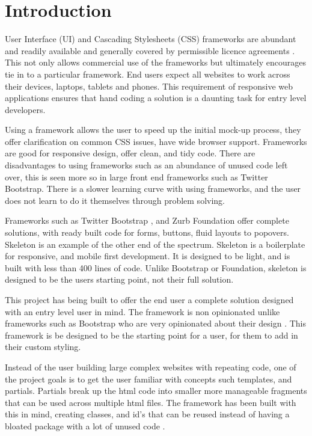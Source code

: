 \newpage
\chapter*{Introduction}

%
%

User Interface (UI) and Cascading Stylesheets (CSS) frameworks are abundant and readily available and generally covered by permissible licence agreements \citep{CODY16}. This not only allows commercial use of the frameworks but ultimately encourages tie in to a particular framework. End users expect all websites to work across their devices, laptops, tablets and phones. This requirement of responsive web applications ensures that hand coding a solution is a daunting task for entry level developers.

Using a framework allows the user to speed up the initial mock-up process, they offer clarification on common CSS issues, have wide browser support. Frameworks are good for responsive design, offer clean, and tidy code. There are disadvantages to using frameworks such as an abundance of unused code left over, this is seen more so in large front end frameworks such as Twitter Bootstrap. There is a slower learning curve with using frameworks, and the user does not learn to do it themselves through problem solving. 

Frameworks such as Twitter Bootstrap \citep{SASS16}, and Zurb Foundation \citep{LESS16} offer complete solutions, with ready built code for forms, buttons, fluid layouts to popovers. Skeleton \citep{SKEL16} is an example of the other end of the spectrum. Skeleton is a boilerplate for responsive, and mobile first development. It is designed to be light, and is built with less than 400 lines of code. Unlike Bootstrap or Foundation, skeleton is designed to be the users starting point, not their full solution. 

This project has being built to offer the end user a complete solution designed with an entry level user in mind. The framework is non opinionated unlike frameworks such as Bootstrap who are very opinionated about their design \citet{KEMH16}. This framework is be designed to be the starting point for a user, for them to add in their custom styling. 

Instead of the user building large complex websites with repeating code, one of the project goals is to get the user familiar with concepts such templates, and partials. Partials break up the html code into smaller more manageable fragments that can be used across multiple html files. The framework has been built with this in mind, creating classes, and id's that can be reused instead of having a bloated package with a lot of unused code \citep{KAR15}.

